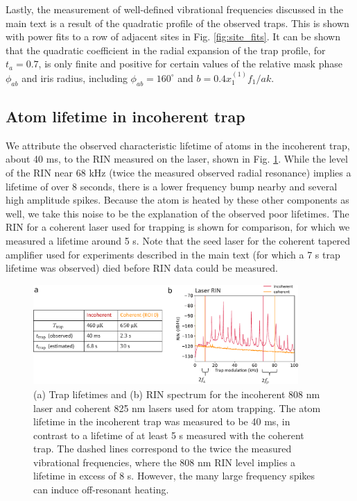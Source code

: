 Lastly, the measurement of well-defined vibrational frequencies discussed in the main text is a result of the quadratic profile of the observed traps. This is shown with power fits to a row of adjacent sites in Fig. \ref{fig:site_fits}. It can be shown that the quadratic coefficient in the radial expansion of the trap profile, for $t_a=0.7$, is only finite and positive for certain values of the relative mask phase $\phi_{ab}$ and iris radius, including $\phi_{ab}=160^{\circ}$ and $b=0.4x^{(1)}_1 f_1/a k$.

\subsection{Atom lifetime in incoherent trap}\label{sub:lifetime}
We attribute the observed characteristic lifetime of atoms in the incoherent trap, about 40 ms, to the RIN measured on the laser, shown in Fig. \ref{fig:rin}. While the level of the RIN near 68 kHz (twice the measured observed radial resonance) implies a lifetime of over 8 seconds\cite{Gehm1998}, there is a lower frequency bump nearby and several high amplitude spikes. Because the atom is heated by these other components as well, we take this noise to be the explanation of the observed poor lifetimes.
The RIN for a coherent laser used for trapping is shown for comparison, for which we measured a lifetime around 5 s. Note that the seed laser for the coherent tapered amplifier used for experiments described in the main text (for which a 7 s trap lifetime was observed) died before RIN data could be measured. 

\begin{figure}[t!]
    \centering
    \includegraphics[width=0.9\textwidth]{Images/trap_array_frequencies_and_lifetimes.pdf}
    \caption{(a) Trap lifetimes and (b) RIN spectrum for the incoherent 808 nm laser and coherent 825 nm lasers used for atom trapping. The  atom lifetime in the incoherent trap was measured to be 40 ms, in contrast to a lifetime of at least 5 s measured with the coherent trap. The dashed lines correspond to the twice the measured vibrational frequencies, where the 808 nm RIN level implies a lifetime in excess of 8 s. However, the many large frequency spikes can induce off-resonant heating.}
    \label{fig:rin}
\end{figure}

